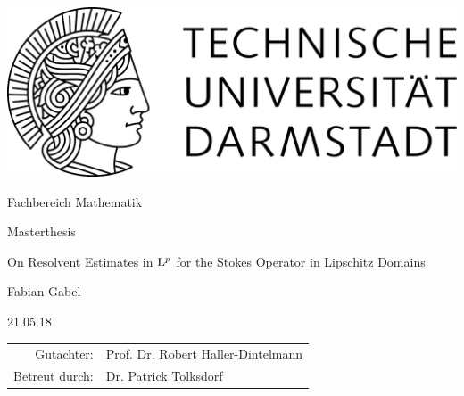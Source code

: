 \begin{titlepage}
  \begin{center}
    \includegraphics[width=0.5\linewidth]{TU_Darmstadt_Logo.pdf}
    \vfill
    
    \large{Fachbereich Mathematik}
    \vfill
    
    \large{Masterthesis}
    \vfill

    \huge{On Resolvent Estimates in $\mathrm{L}^p$ for the Stokes Operator in Lipschitz Domains}
    \vfill
    
		\large
    Fabian Gabel

    \large 21.05.18
    \vfill
\begin{tabular}{rl}
    Gutachter:& Prof. Dr. Robert Haller-Dintelmann
    \\
    Betreut durch:& Dr. Patrick Tolksdorf
\end{tabular}
  \end{center}
\end{titlepage}
